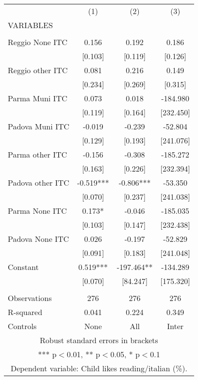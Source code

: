 \begin{tabular}{lccc} \hline
 & (1) & (2) & (3) \\
VARIABLES &  &  &  \\ \hline
 &  &  &  \\
Reggio None ITC & 0.156 & 0.192 & 0.186 \\
 & [0.103] & [0.119] & [0.126] \\
Reggio other ITC & 0.081 & 0.216 & 0.149 \\
 & [0.234] & [0.269] & [0.315] \\
Parma Muni ITC & 0.073 & 0.018 & -184.980 \\
 & [0.119] & [0.164] & [232.450] \\
Padova Muni ITC & -0.019 & -0.239 & -52.804 \\
 & [0.129] & [0.193] & [241.076] \\
Parma other ITC & -0.156 & -0.308 & -185.272 \\
 & [0.163] & [0.226] & [232.394] \\
Padova other ITC & -0.519*** & -0.806*** & -53.350 \\
 & [0.070] & [0.237] & [241.038] \\
Parma None ITC & 0.173* & -0.046 & -185.035 \\
 & [0.103] & [0.147] & [232.438] \\
Padova None ITC & 0.026 & -0.197 & -52.829 \\
 & [0.091] & [0.183] & [241.048] \\
Constant & 0.519*** & -197.464** & -134.289 \\
 & [0.070] & [84.247] & [175.320] \\
 &  &  &  \\
Observations & 276 & 276 & 276 \\
R-squared & 0.041 & 0.224 & 0.349 \\
 Controls & None & All & Inter \\ \hline
\multicolumn{4}{c}{ Robust standard errors in brackets} \\
\multicolumn{4}{c}{ *** p$<$0.01, ** p$<$0.05, * p$<$0.1} \\
\multicolumn{4}{c}{ Dependent variable: Child likes reading/italian (\%).} \\
\end{tabular}
